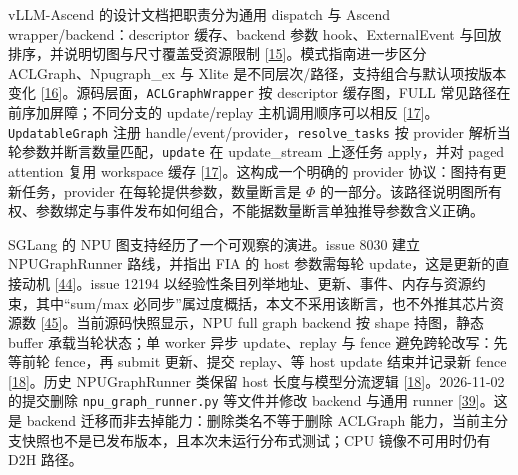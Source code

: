 \documentclass[
  UTF8,
  zihao=5]{ctexart}
\begin{document}
vLLM-Ascend 的设计文档把职责分为通用 dispatch 与 Ascend
wrapper/backend：descriptor 缓存、backend 参数 hook、ExternalEvent
与回放排序，并说明切图与尺寸覆盖受资源限制
{[}\protect\hyperlink{ref-vllmascenddesign}{15}{]}。模式指南进一步区分
ACLGraph、Npugraph\_ex 与 Xlite
是不同层次/路径，支持组合与默认项按版本变化
{[}\protect\hyperlink{ref-vllmascendmode}{16}{]}。源码层面，\texttt{ACLGraphWrapper}
按 descriptor 缓存图，FULL 常见路径在前序加屏障；不同分支的
update/replay 主机调用顺序可以相反
{[}\protect\hyperlink{ref-vllmascend2026impl}{17}{]}。\texttt{UpdatableGraph}
注册 handle/event/provider，\texttt{resolve\_tasks} 按 provider
解析当轮参数并断言数量匹配，\texttt{update} 在 update\_stream 上逐任务
apply，并对 paged attention 复用 workspace 缓存
{[}\protect\hyperlink{ref-vllmascend2026impl}{17}{]}。这构成一个明确的
provider 协议：图持有更新任务，provider 在每轮提供参数，数量断言是
\(\Phi\)
的一部分。该路径说明图所有权、参数绑定与事件发布如何组合，不能据数量断言单独推导参数含义正确。

SGLang 的 NPU 图支持经历了一个可观察的演进。issue 8030 建立
NPUGraphRunner 路线，并指出 FIA 的 host 参数需每轮
update，这是更新的直接动机
{[}\protect\hyperlink{ref-sglang8030}{44}{]}。issue 12194
以经验性条目列举地址、更新、事件、内存与资源约束，其中``sum/max
必同步''属过度概括，本文不采用该断言，也不外推其芯片资源数
{[}\protect\hyperlink{ref-sglang12194}{45}{]}。当前源码快照显示，NPU
full graph backend 按 shape 持图，静态 buffer 承载当轮状态；单 worker
异步 update、replay 与 fence 避免跨轮改写：先等前轮 fence，再 submit
更新、提交 replay、等 host update 结束并记录新 fence
{[}\protect\hyperlink{ref-sglang2026impl}{18}{]}。历史 NPUGraphRunner
类保留 host 长度与模型分流逻辑
{[}\protect\hyperlink{ref-sglang2026impl}{18}{]}。2026-11-02 的提交删除
\texttt{npu\_graph\_runner.py} 等文件并修改 backend 与通用 runner
{[}\protect\hyperlink{ref-sglang2026refactor}{39}{]}。这是 backend
迁移而非去掉能力：删除类名不等于删除 ACLGraph
能力，当前主分支快照也不是已发布版本，且本次未运行分布式测试；CPU
镜像不可用时仍有 D2H 路径。
\end{document}
